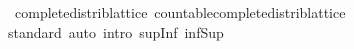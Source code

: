 \begin{isabellebody}
\endisatagproof
{\isafoldproof}%
%
\isadelimproof
\isanewline
%
\endisadelimproof
\isanewline
{}\isamarkupfalse%
\ {\isacharparenleft}\ complete{\isacharunderscore}distrib{\isacharunderscore}lattice{\isacharparenright}\ countable{\isacharunderscore}complete{\isacharunderscore}distrib{\isacharunderscore}lattice\isanewline
%
\isadelimproof
\ \ %
\endisadelimproof
%
\isatagproof
{}\isamarkupfalse%
\ standard\ {\isacharparenleft}auto\ intro{\isacharcolon}\ sup{\isacharunderscore}Inf\ inf{\isacharunderscore}Sup{\isacharparenright}%
\endisatagproof
{\isafoldproof}%
%
\isadelimproof
\isanewline
%
\endisadelimproof
%
\isadelimtheory
\isanewline
%
\endisadelimtheory
%
\isatagtheory
{}\isamarkupfalse%
%
\endisatagtheory
{\isafoldtheory}%
%
\isadelimtheory
%
\endisadelimtheory
%
\end{isabellebody}%
\endinput
